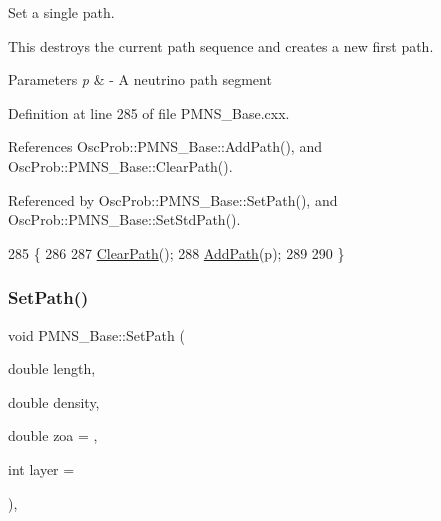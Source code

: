 Set a single path.

This destroys the current path sequence and creates a new first path.


\begin{DoxyParams}{Parameters}
{\em p} & -\/ A neutrino path segment \\
\hline
\end{DoxyParams}


Definition at line 285 of file P\+M\+N\+S\+\_\+\+Base.\+cxx.



References Osc\+Prob\+::\+P\+M\+N\+S\+\_\+\+Base\+::\+Add\+Path(), and Osc\+Prob\+::\+P\+M\+N\+S\+\_\+\+Base\+::\+Clear\+Path().



Referenced by Osc\+Prob\+::\+P\+M\+N\+S\+\_\+\+Base\+::\+Set\+Path(), and Osc\+Prob\+::\+P\+M\+N\+S\+\_\+\+Base\+::\+Set\+Std\+Path().


\begin{DoxyCode}
285                                \{
286 
287   \hyperlink{classOscProb_1_1PMNS__Base_aefe521239031c418cfaaaa550a6e13bb}{ClearPath}();
288   \hyperlink{classOscProb_1_1PMNS__Base_a887dc9d4dc569ec0cdef3933b4c60efc}{AddPath}(p);
289 
290 \}
\end{DoxyCode}
\mbox{\label{classOscProb_1_1PMNS__Base_a35b983270613072a3df58b574d80dbfd}} 
\subsubsection{\texorpdfstring{Set\+Path()}{SetPath()}\hspace{0.1cm}{\footnotesize\ttfamily [2/3]}}
{\footnotesize\ttfamily void P\+M\+N\+S\+\_\+\+Base\+::\+Set\+Path (\begin{DoxyParamCaption}\item[{double}]{length,  }\item[{double}]{density,  }\item[{double}]{zoa = {},  }\item[{int}]{layer = {} }\end{DoxyParamCaption})\hspace{0.3cm}{\ttfamily [virtual]}, {\ttfamily [inherited]}}


